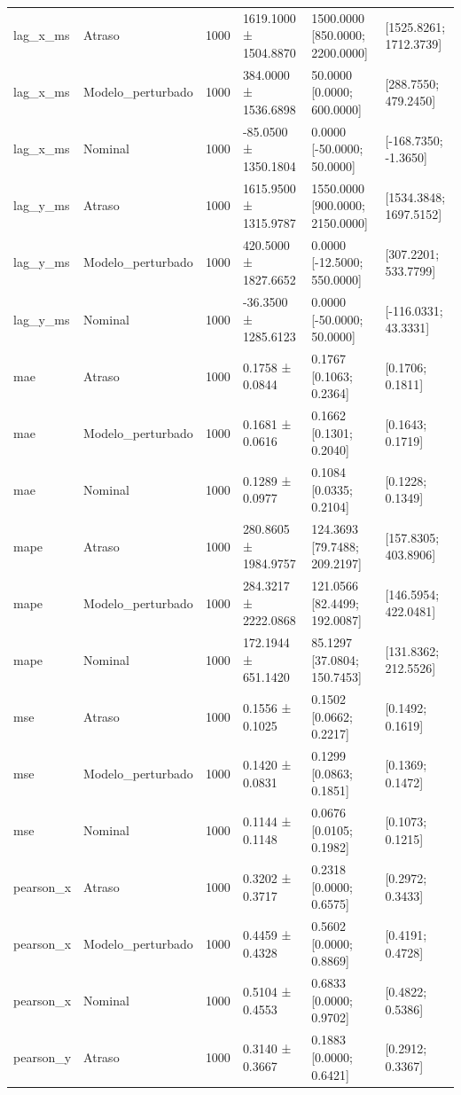 \begin{tabular}{llclll}
lag_x_ms & Atraso & 1000 & 1619.1000 ± 1504.8870 & 1500.0000 [850.0000; 2200.0000] & [1525.8261; 1712.3739] \\
lag_x_ms & Modelo_perturbado & 1000 & 384.0000 ± 1536.6898 & 50.0000 [0.0000; 600.0000] & [288.7550; 479.2450] \\
lag_x_ms & Nominal & 1000 & -85.0500 ± 1350.1804 & 0.0000 [-50.0000; 50.0000] & [-168.7350; -1.3650] \\
lag_y_ms & Atraso & 1000 & 1615.9500 ± 1315.9787 & 1550.0000 [900.0000; 2150.0000] & [1534.3848; 1697.5152] \\
lag_y_ms & Modelo_perturbado & 1000 & 420.5000 ± 1827.6652 & 0.0000 [-12.5000; 550.0000] & [307.2201; 533.7799] \\
lag_y_ms & Nominal & 1000 & -36.3500 ± 1285.6123 & 0.0000 [-50.0000; 50.0000] & [-116.0331; 43.3331] \\
mae & Atraso & 1000 & 0.1758 ± 0.0844 & 0.1767 [0.1063; 0.2364] & [0.1706; 0.1811] \\
mae & Modelo_perturbado & 1000 & 0.1681 ± 0.0616 & 0.1662 [0.1301; 0.2040] & [0.1643; 0.1719] \\
mae & Nominal & 1000 & 0.1289 ± 0.0977 & 0.1084 [0.0335; 0.2104] & [0.1228; 0.1349] \\
mape & Atraso & 1000 & 280.8605 ± 1984.9757 & 124.3693 [79.7488; 209.2197] & [157.8305; 403.8906] \\
mape & Modelo_perturbado & 1000 & 284.3217 ± 2222.0868 & 121.0566 [82.4499; 192.0087] & [146.5954; 422.0481] \\
mape & Nominal & 1000 & 172.1944 ± 651.1420 & 85.1297 [37.0804; 150.7453] & [131.8362; 212.5526] \\
mse & Atraso & 1000 & 0.1556 ± 0.1025 & 0.1502 [0.0662; 0.2217] & [0.1492; 0.1619] \\
mse & Modelo_perturbado & 1000 & 0.1420 ± 0.0831 & 0.1299 [0.0863; 0.1851] & [0.1369; 0.1472] \\
mse & Nominal & 1000 & 0.1144 ± 0.1148 & 0.0676 [0.0105; 0.1982] & [0.1073; 0.1215] \\
pearson_x & Atraso & 1000 & 0.3202 ± 0.3717 & 0.2318 [0.0000; 0.6575] & [0.2972; 0.3433] \\
pearson_x & Modelo_perturbado & 1000 & 0.4459 ± 0.4328 & 0.5602 [0.0000; 0.8869] & [0.4191; 0.4728] \\
pearson_x & Nominal & 1000 & 0.5104 ± 0.4553 & 0.6833 [0.0000; 0.9702] & [0.4822; 0.5386] \\
pearson_y & Atraso & 1000 & 0.3140 ± 0.3667 & 0.1883 [0.0000; 0.6421] & [0.2912; 0.3367] \\

\end{tabular}
